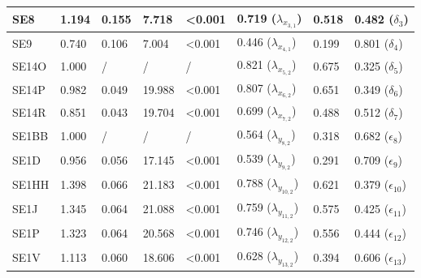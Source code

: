 \documentclass[11pt]{article}
\begin{document}
\begin{table}[h!]
{\begin{tabular}{|l|l|l|l|l|l|l|l|}
SE8               & 1.194            & 0.155                   &  7.718           & \textless 0.001      & 0.719 \hfill ($\lambda_{x_{3,1}}$)  &  0.518               & 0.482 \hfill ($\delta_3$)  \\ \hline
SE9               & 0.740            & 0.106                   &  7.004           & \textless 0.001      & 0.446 \hfill ($\lambda_{x_{4,1}}$)  &  0.199               & 0.801 \hfill ($\delta_4$)  \\ \hline
%                                                                                                                                
SE14O             & 1.000            & /                       & /                & /                    & 0.821 \hfill ($\lambda_{x_{5,2}}$)  &  0.675               & 0.325 \hfill ($\delta_5$)  \\ \hline
SE14P             & 0.982            & 0.049                   & 19.988           & \textless 0.001      & 0.807 \hfill ($\lambda_{x_{6,2}}$)  &  0.651               & 0.349 \hfill ($\delta_6$)  \\ \hline
SE14R             & 0.851            & 0.043                   & 19.704           & \textless 0.001      & 0.699 \hfill ($\lambda_{x_{7,2}}$)  &  0.488               & 0.512 \hfill ($\delta_7$)  \\ \hline
%                                                                                                                                
SE1BB             & 1.000            & /                       & /                & /                    & 0.564 \hfill ($\lambda_{y_{8,2}} $)  &  0.318               & 0.682 \hfill ($\epsilon_8   $)  \\ \hline
SE1D              & 0.956            & 0.056                   & 17.145           & \textless 0.001      & 0.539 \hfill ($\lambda_{y_{9,2}} $)  &  0.291               & 0.709 \hfill ($\epsilon_9   $)  \\ \hline
SE1HH             & 1.398            & 0.066                   & 21.183           & \textless 0.001      & 0.788 \hfill ($\lambda_{y_{10,2}}$)  &  0.621               & 0.379 \hfill ($\epsilon_{10}$)  \\ \hline
SE1J              & 1.345            & 0.064                   & 21.088           & \textless 0.001      & 0.759 \hfill ($\lambda_{y_{11,2}}$)  &  0.575               & 0.425 \hfill ($\epsilon_{11}$)  \\ \hline
SE1P              & 1.323            & 0.064                   & 20.568           & \textless 0.001      & 0.746 \hfill ($\lambda_{y_{12,2}}$)  &  0.556               & 0.444 \hfill ($\epsilon_{12}$)  \\ \hline
SE1V              & 1.113            & 0.060                   & 18.606           & \textless 0.001      & 0.628 \hfill ($\lambda_{y_{13,2}}$)  &  0.394               & 0.606 \hfill ($\epsilon_{13}$)  \\ \hline
\end{tabular}                                                                                                                                           
}
\end{table}
\end{document}
